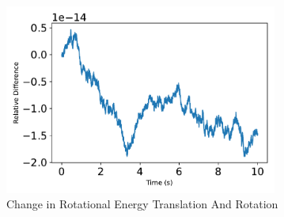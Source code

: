 \begin{figure}[htbp]\centerline{\includegraphics[width=0.8\textwidth]{AutoTeX/scPlusChangeInRotationalEnergyTranslationAndRotation}}\caption{Change in Rotational Energy Translation And Rotation}\label{fig:scPlusChangeInRotationalEnergyTranslationAndRotation}\end{figure}